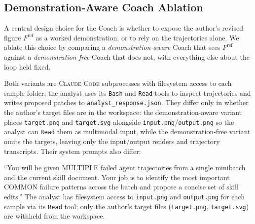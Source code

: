 \documentclass[11pt]{article}
\begin{document}
\subsection{Demonstration-Aware Coach Ablation}
\label{sec:appendix-demo-aware}

A central design choice for the Coach is whether to expose
the author's revised figure $F^{\mathrm{ref}}$ as a worked
demonstration, or to rely on the trajectories alone.  We
ablate this choice by comparing a \emph{demonstration-aware}
Coach that sees $F^{\mathrm{ref}}$ against a
\emph{demonstration-free} Coach that does not, with
everything else about the loop held fixed.

Both variants are \textsc{Claude Code} subprocesses with
filesystem access to each sample folder; the analyst uses its
\texttt{Bash} and \texttt{Read} tools to inspect trajectories
and writes proposed patches to
\texttt{analyst\_response.json}.  They differ only in whether
the author's target files are in the workspace: the
demonstration-aware variant places \texttt{target.png} and
\texttt{target.svg} alongside
\texttt{input.png}/\texttt{output.png} so the analyst can
\texttt{Read} them as multimodal input, while the
demonstration-free variant omits the targets, leaving only
the input/output renders and trajectory transcripts.  Their
system prompts also differ:

\begin{tcolorbox}[
  enhanced, breakable,
  colback=cardVerif!4!white, colframe=cardVerif,
  colbacktitle=cardVerif, coltitle=white,
  fonttitle=\bfseries\small,
  title={Demonstration-Free Analyst},
  boxrule=0.4pt, arc=2pt,
  left=4pt, right=4pt, top=4pt, bottom=4pt,
  before skip=4pt, after skip=4pt
]
\small
``You will be given MULTIPLE failed agent trajectories from a
single minibatch and the current skill document.  Your job is
to identify the most important COMMON failure patterns across
the batch and propose a concise set of skill edits.''  The
analyst has filesystem access to \texttt{input.png} and
\texttt{output.png} for each sample via its \texttt{Read}
tool; only the author's target files
(\texttt{target.png}, \texttt{target.svg}) are withheld from
the workspace.
\end{tcolorbox}
\end{document}
